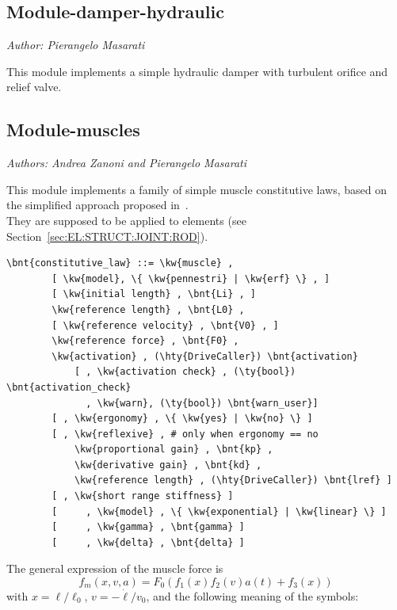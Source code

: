\subsection{Module-damper-hydraulic}
\emph{Author: Pierangelo Masarati}

\noindent
This module implements a simple hydraulic damper with turbulent orifice and relief valve.

\subsection{Module-muscles}
\emph{Authors: Andrea Zanoni and Pierangelo Masarati}

\bigskip

\noindent
This module implements a family of simple muscle constitutive laws,
based on the simplified approach proposed in~\cite{PENNESTRI-2007-JB}.\\
They are supposed to be applied to  elements 
(see Section~\ref{sec:EL:STRUCT:JOINT:ROD}).
\begin{Verbatim}[commandchars=\\\{\}]
    \bnt{constitutive_law} ::= \kw{muscle} ,
        [ \kw{model}, \{ \kw{pennestri} | \kw{erf} \} , ]
        [ \kw{initial length} , \bnt{Li} , ]
        \kw{reference length} , \bnt{L0} ,
        [ \kw{reference velocity} , \bnt{V0} , ]
        \kw{reference force} , \bnt{F0} ,
        \kw{activation} , (\hty{DriveCaller}) \bnt{activation}
            [ , \kw{activation check} , (\ty{bool}) \bnt{activation_check}
              , \kw{warn}, (\ty{bool}) \bnt{warn_user}]
        [ , \kw{ergonomy} , \{ \kw{yes} | \kw{no} \} ]
        [ , \kw{reflexive} , # only when ergonomy == no
            \kw{proportional gain} , \bnt{kp} ,
            \kw{derivative gain} , \bnt{kd} ,
            \kw{reference length} , (\hty{DriveCaller}) \bnt{lref} ]
        [ , \kw{short range stiffness} ]
        [     , \kw{model} , \{ \kw{exponential} | \kw{linear} \} ]
        [     , \kw{gamma} , \bnt{gamma} ]
        [     , \kw{delta} , \bnt{delta} ]
\end{Verbatim}
The general expression of the muscle force is
\begin{equation}
  f_m(x, v, a) = F_0\left(f_1(x)f_2(v)a(t) + f_3(x)\right)
\end{equation}
with $x = \ell/\ell_0$, $v = -\dot{\ell}/v_0$, and the following meaning of 
the symbols:
